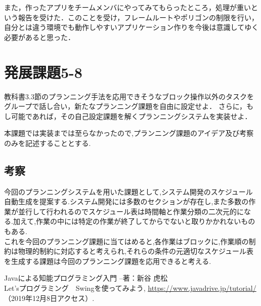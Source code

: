 \documentclass[uplatex,12pt]{jsarticle}
\begin{document}
また，作ったアプリをチームメンバにやってみてもらったところ，処理が重いという報告を受けた．このことを受け，フレームルートやポリゴンの制限を行い，自分とは違う環境でも動作しやすいアプリケーション作りを今後は意識してゆく必要があると思った．



\section{発展課題5-8}
\begin{screen}
    教科書3.3節のプランニング手法を応用できそうなブロック操作以外のタスクをグループで話し合い，新たなプランニング課題を自由に設定せよ．
    さらに，もし可能であれば，その自己設定課題を解くプランニングシステムを実装せよ．
\end{screen}
本課題では実装までは至らなかったので,プランニング課題のアイデア及び考察のみを記述することとする.
​
\subsection{考察}
今回のプランニングシステムを用いた課題として,システム開発のスケジュール自動生成を提案する.システム開発には多数のセクションが存在し,また多数の作業が並行して行われるのでスケジュール表は時間軸と作業分類の二次元的になる.加えて,作業の中には特定の作業が終了してからでないと取りかかれないものもある.\\
これを今回のプランニング課題に当てはめると,各作業はブロックに,作業順の制約は物理的制約に対応すると考えられ,それらの条件の元適切なスケジュール表を生成する課題は今回のプランニング課題を応用できると考える.


\begin{thebibliography}{99}
 Javaによる知能プログラミング入門 --著：新谷 虎松 \\
 Let'sプログラミング　Swingを使ってみよう, \url{https://www.javadrive.jp/tutorial/} （2019年12月8日アクセス）.
\end{thebibliography}
\end{document}
